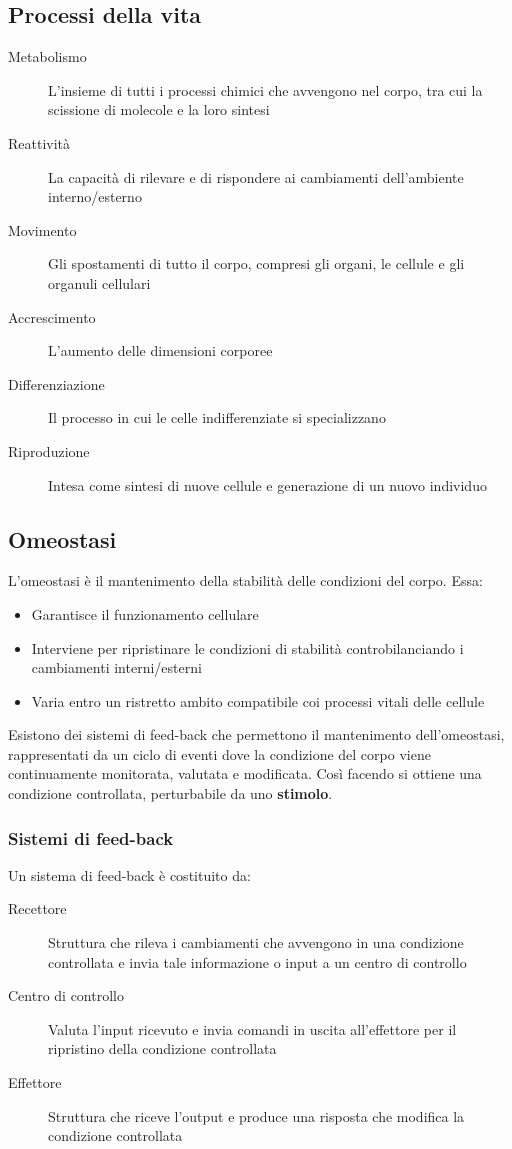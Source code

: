 \documentclass[a4paper]{article}
\begin{document}
\subsection{Processi della vita}
\begin{description}
    \item[Metabolismo] L'insieme di tutti i processi chimici che avvengono nel
    corpo, tra cui la scissione di molecole e la loro sintesi
    \item[Reattività] La capacità di rilevare e di rispondere ai cambiamenti
    dell'ambiente interno/esterno
    \item[Movimento] Gli spostamenti di tutto il corpo, compresi gli organi, le
    cellule e gli organuli cellulari
    \item[Accrescimento] L'aumento delle dimensioni corporee
    \item[Differenziazione] Il processo in cui le celle indifferenziate si
    specializzano
    \item[Riproduzione] Intesa come sintesi di nuove cellule e generazione di
    un nuovo individuo
\end{description}
\subsection{Omeostasi}
L'omeostasi è il mantenimento della stabilità delle condizioni del corpo. 
Essa:
\begin{itemize}
    \item Garantisce il funzionamento cellulare
    \item Interviene per ripristinare le condizioni di stabilità 
    controbilanciando i cambiamenti interni/esterni
    \item Varia entro un ristretto ambito compatibile coi processi vitali delle
    cellule
\end{itemize}
Esistono dei sistemi di feed-back che permettono il mantenimento dell'omeostasi,
rappresentati da un ciclo di eventi dove la condizione del corpo viene 
continuamente monitorata, valutata e modificata. Così facendo si ottiene una
condizione controllata, perturbabile da uno \textbf{stimolo}.

\subsubsection{Sistemi di feed-back}
Un sistema di feed-back è costituito da:
\begin{description}
    \item[Recettore] Struttura che rileva i cambiamenti che avvengono in una 
    condizione controllata e invia tale informazione o input a un centro di 
    controllo
    \item[Centro di controllo] Valuta l’input ricevuto e invia comandi in 
    uscita all’effettore per il ripristino della condizione controllata
    \item[Effettore] Struttura che riceve l’output e produce una risposta 
    che modifica la condizione controllata
\end{description}
\end{document}
